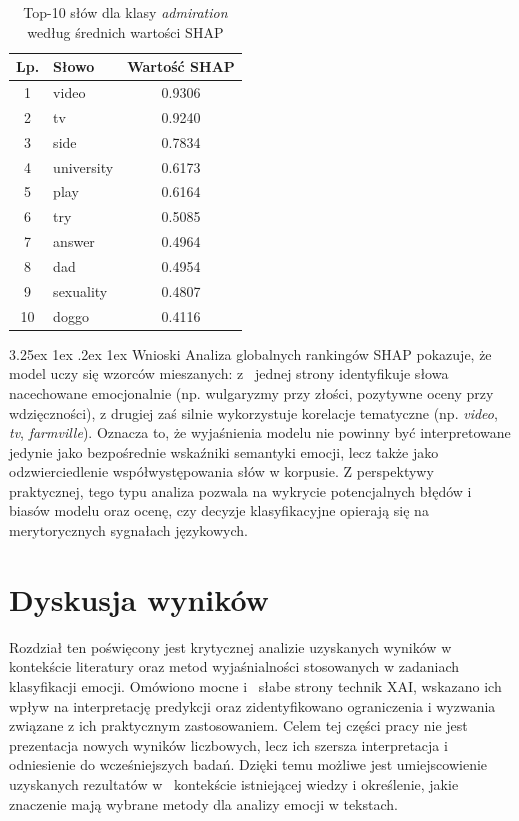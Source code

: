 \documentclass[wmii, inf, mgr]{uwmthesis}
\makeatletter
\renewcommand\paragraph{\@startsection{paragraph}{4}{\z@}%
  {3.25ex \@plus1ex \@minus.2ex}%
  {1ex}%
  {\normalfont\normalsize\bfseries}}
\makeatother
\begin{document}
\begin{table}[H]
	\centering
	\renewcommand{\arraystretch}{1.2}
	\begin{tabular}{|c|l|c|}
		\hline
		\textbf{Lp.} & \textbf{Słowo} & \textbf{Wartość SHAP} \\ \hline
		1 & video        & 0.9306 \\ \hline
		2 & tv           & 0.9240 \\ \hline
		3 & side         & 0.7834 \\ \hline
		4 & university   & 0.6173 \\ \hline
		5 & play         & 0.6164 \\ \hline
		6 & try          & 0.5085 \\ \hline
		7 & answer       & 0.4964 \\ \hline
		8 & dad          & 0.4954 \\ \hline
		9 & sexuality    & 0.4807 \\ \hline
		10 & doggo       & 0.4116 \\ \hline
	\end{tabular}
	\caption{Top-10 słów dla klasy \textit{admiration} według średnich wartości SHAP}
	\label{tab:shap_admiration}
\end{table}


\paragraph{Wnioski}
Analiza globalnych rankingów SHAP pokazuje, że model uczy się wzorców mieszanych: z~ jednej strony identyfikuje słowa nacechowane emocjonalnie (np. wulgaryzmy przy złości, pozytywne oceny przy wdzięczności), z drugiej zaś silnie wykorzystuje korelacje tematyczne (np. \textit{video}, \textit{tv}, \textit{farmville}). Oznacza to, że wyjaśnienia modelu nie powinny być interpretowane jedynie jako bezpośrednie wskaźniki semantyki emocji, lecz także jako odzwierciedlenie współwystępowania słów w korpusie. Z perspektywy praktycznej, tego typu analiza pozwala na wykrycie potencjalnych błędów i biasów modelu oraz ocenę, czy decyzje klasyfikacyjne opierają się na merytorycznych sygnałach językowych.


\chapter{Dyskusja wyników}
Rozdział ten poświęcony jest krytycznej analizie uzyskanych wyników w kontekście literatury oraz metod wyjaśnialności stosowanych w zadaniach klasyfikacji emocji. Omówiono mocne i~ słabe strony technik XAI, wskazano ich wpływ na interpretację predykcji oraz zidentyfikowano ograniczenia i wyzwania związane z ich praktycznym zastosowaniem. Celem tej części pracy nie jest prezentacja nowych wyników liczbowych, lecz ich szersza interpretacja i odniesienie do wcześniejszych badań. Dzięki temu możliwe jest umiejscowienie uzyskanych rezultatów w~ kontekście istniejącej wiedzy i określenie, jakie znaczenie mają wybrane metody dla analizy emocji w tekstach.
\end{document}
